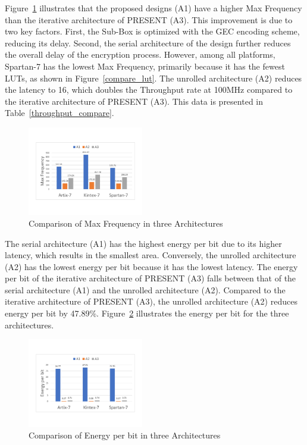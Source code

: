 \documentclass[final,5p,times,twocolumn]{elsarticle}
\begin{document}
Figure~\ref{compare-maxF} illustrates that the proposed designs (A1) have a higher Max Frequency than the iterative architecture of PRESENT (A3). This improvement is due to two key factors. First, the Sub-Box is optimized with the GEC encoding scheme, reducing its delay. Second, the serial architecture of the design further reduces the overall delay of the encryption process. However, among all platforms, Spartan-7 has the lowest Max Frequency, primarily because it has the fewest LUTs, as shown in Figure~\ref{compare_lut}. The unrolled architecture (A2) reduces the latency to 16, which doubles the Throughput rate at 100MHz compared to the iterative architecture of PRESENT (A3). This data is presented in Table~\ref{throughput_compare}.

\begin{figure}
    \centering
    \includegraphics[width=0.45\textwidth]{./fig/compare-maxf.pdf}
    \caption{Comparison of Max Frequency in three Architectures}\label{compare-maxF}
\end{figure}

The serial architecture (A1) has the highest energy per bit due to its higher latency, which results in the smallest area. Conversely, the unrolled architecture (A2) has the lowest energy per bit because it has the lowest latency. The energy per bit of the iterative architecture of PRESENT (A3) falls between that of the serial architecture (A1) and the unrolled architecture (A2). Compared to the iterative architecture of PRESENT (A3), the unrolled architecture (A2) reduces energy per bit by 47.89\%. Figure~\ref{compare-energy} illustrates the energy per bit for the three architectures.

\begin{figure}
    \centering
    \includegraphics[width=0.45\textwidth]{./fig/compare-energy.pdf}
    \caption{Comparison of Energy per bit in three Architectures}\label{compare-energy}
\end{figure}
\end{document}
